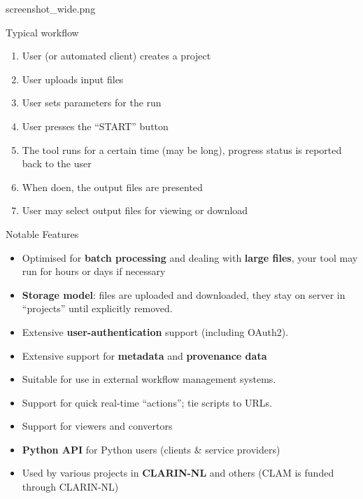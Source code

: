 \documentclass[xcolor=table,10pt,t]{beamer}
\begin{document}
\begin{tussenpagina}{ }{ }{screenshot_wide.png}
\end{tussenpagina}

\begin{frame}{Typical workflow}
  \begin{enumerate}
    \item User (or automated client) creates a project
    \item User uploads input files
    \item User sets parameters for the run
    \item User presses the ``START'' button
    \item The tool runs for a certain time (may be long), progress status is
      reported back to the user
    \item When doen, the output files are presented
    \item User may select output files for viewing or download
  \end{enumerate}
\end{frame}


\begin{frame}{Notable Features}
  \begin{block}{}
      \begin{itemize}
        \item Optimised for \textbf{batch processing} and dealing with
          \textbf{large files}, your tool may run for hours or days if necessary
        \item \textbf{Storage model}: files are uploaded and downloaded, they stay on server in ``projects'' until explicitly removed.
        \item Extensive \textbf{user-authentication} support (including OAuth2).
        \item Extensive support for \textbf{metadata} and \textbf{provenance
          data}
        \item Suitable for use in external workflow management systems.
        \item Support for quick real-time ``actions''; tie scripts to URLs.
        \item Support for viewers and convertors
        \item \textbf{Python API} for Python users (clients \& service providers)
        \item Used by various projects in \textbf{CLARIN-NL} and others (CLAM is funded through CLARIN-NL)
      \end{itemize}
  \end{block}
\end{frame}
\end{document}
